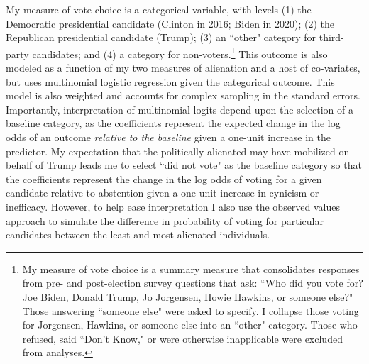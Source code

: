 \documentclass[12pt]{article}
\begin{document}
My measure of vote choice is a categorical variable, with levels (1) the Democratic presidential candidate (Clinton in 2016; Biden in 2020); (2) the Republican presidential candidate (Trump); (3) an ``other" category for third-party candidates; and (4) a category for non-voters.\footnote{My measure of vote choice is a summary measure that consolidates responses from pre- and post-election survey questions that ask: ``Who did you vote for? Joe Biden, Donald Trump, Jo Jorgensen, Howie Hawkins, or someone else?" Those answering ``someone else" were asked to specify. I collapse those voting for Jorgensen, Hawkins, or someone else into an ``other" category. Those who refused, said ``Don't Know," or were otherwise inapplicable were excluded from analyses.} This outcome is also modeled as a function of my two measures of alienation and a host of co-variates, but uses multinomial logistic regression given the categorical outcome. This model is also weighted and accounts for complex sampling in the standard errors. Importantly, interpretation of multinomial logits depend upon the selection of a baseline category, as the coefficients represent the expected change in the log odds of an outcome \textit{relative to the baseline} given a one-unit increase in the predictor. My expectation that the politically alienated may have mobilized on behalf of Trump leads me to select ``did not vote" as the baseline category so that the coefficients represent the change in the log odds of voting for a given candidate relative to abstention given a one-unit increase in cynicism or inefficacy. However, to help ease interpretation I also use the observed values approach \parencite{hanmer2013behind} to simulate the difference in probability of voting for particular candidates between the least and most alienated individuals. 







\end{document}
